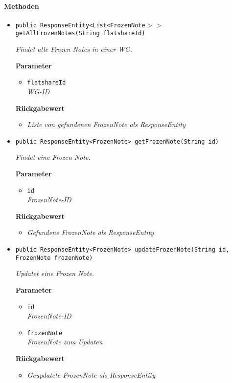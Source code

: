      \paragraph*{Methoden}
     \begin{itemize}
     	\item{\texttt{public ResponseEntity<List<FrozenNote$>>$ getAllFrozenNotes(String flatshareId)}}
     	
     	\textit{Findet alle Frozen Notes in einer WG.}
     	
     	\textbf{Parameter}
     	\begin{itemize}
     		\item\texttt{flatshareId}\\
     		\textit{WG-ID} 
     	\end{itemize}
     	
     	\textbf{Rückgabewert}
     	\begin{itemize}
     		\item\textit{Liste von gefundenen FrozenNote als ResponseEntity} 
     	\end{itemize}
     	
     \item{\texttt{public ResponseEntity<FrozenNote> getFrozenNote(String id)}}
     	
     	\textit{Findet eine Frozen Note.}
     	
     	\textbf{Parameter}
     	\begin{itemize}
     		\item\texttt{id}\\
     		\textit{FrozenNote-ID} 
     	\end{itemize}
     	
     	\textbf{Rückgabewert}
     	\begin{itemize}
     		\item\textit{Gefundene FrozenNote als ResponseEntity} 
     	\end{itemize}
     
     \item{\texttt{public ResponseEntity<FrozenNote> updateFrozenNote(String id, FrozenNote frozenNote)}}
     	
     	\textit{Updatet eine Frozen Note.}
     	
     	\textbf{Parameter}
     	\begin{itemize}
     		\item\texttt{id}\\
     		\textit{FrozenNote-ID} 
     		\item\texttt{frozenNote}\\
     		\textit{FrozenNote zum Updaten} 
     	\end{itemize}
     	
     	\textbf{Rückgabewert}
     	\begin{itemize}
     		\item\textit{Geupdatete FrozenNote als ResponseEntity} 
     	\end{itemize}
     \end{itemize}
 
